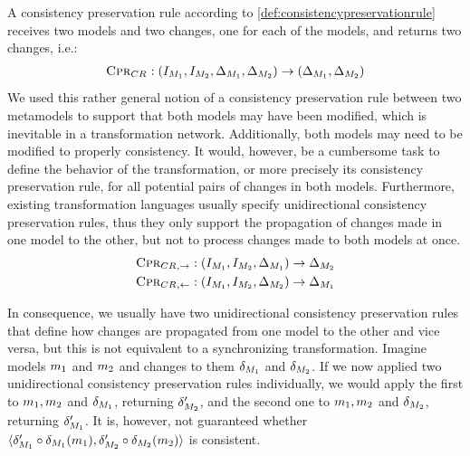 A consistency preservation rule according to \autoref{def:consistencypreservationrule} receives two models and two changes, one for each of the models, and returns two changes, i.e.:
\begin{align*}
    \textsc{Cpr}_{CR_{}} : (I_{M_{1}}, I_{M_{2}}, \Delta_{M_{1}}, \Delta_{M_{2}}) \rightarrow (\Delta_{M_{1}}, \Delta_{M_{2}})
\end{align*}
We used this rather general notion of a consistency preservation rule between two metamodels to support that both models may have been modified, which is inevitable in a transformation network.
Additionally, both models may need to be modified to properly consistency.
It would, however, be a cumbersome task to define the behavior of the transformation, or more precisely its consistency preservation rule, for all potential pairs of changes in both models.
Furthermore, existing transformation languages usually specify unidirectional consistency preservation rules, thus they only support the propagation of changes made in one model to the other, but not to process changes made to both models at once.
\begin{align*}
    \textsc{Cpr}_{CR_{},\rightarrow} : (I_{M_{1}}, I_{M_{2}}, \Delta_{M_{1}}) \rightarrow \Delta_{M_{2}}\\
    \textsc{Cpr}_{CR_{},\leftarrow} : (I_{M_{1}}, I_{M_{2}}, \Delta_{M_{2}}) \rightarrow \Delta_{M_{1}}
\end{align*}

In consequence, we usually have two unidirectional consistency preservation rules that define how changes are propagated from one model to the other and vice versa, but this is not equivalent to a synchronizing transformation.
Imagine models $m_{1}$ and $m_{2}$ and changes to them $\delta_{M_{1}}$ and $\delta_{M_{2}}$.
If we now applied two unidirectional consistency preservation rules individually, we would apply the first to $m_{1},m_{2}$ and $\delta_{M_{1}}$, returning $\delta_{M_{2}}'$, and the second one to $m_{1},m_{2}$ and $\delta_{M_{2}}$, returning $\delta_{M_{1}}'$.
It is, however, not guaranteed whether $\langle \delta_{M_{1}}' \circ \delta_{M_{1}}(m_{1}), \delta_{M_{2}}' \circ \delta_{M_{2}}(m_{2}) \rangle$ is consistent.


